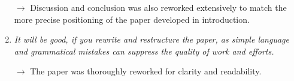 \documentclass[11pt,a4paper,sans]{moderncv}        %
\begin{document}
\begin{enumerate}
    $\rightarrow$ Discussion and conclusion was also reworked extensively to match the more precise positioning of the paper developed in introduction.
    
    \medskip
    
	\item \textit{It will be good, if you rewrite and restructure the paper, as simple language and grammatical mistakes can suppress the quality of work and efforts.}

	$\rightarrow$ The paper was thoroughly reworked for clarity and readability.

\end{enumerate}

\end{document}
